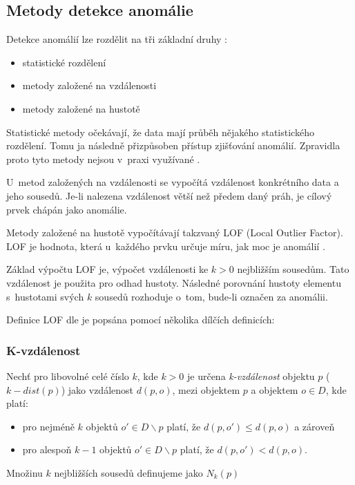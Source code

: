 \documentclass[thesis=M,czech]{FITthesis}[2012/10/20]
\begin{document}
		\subsection{Metody detekce anomálie}
			Detekce anomálií lze rozdělit na tři základní druhy \cite{KumarPCAANom}: 
			\begin{itemize} 
				\item statistické rozdělení
				\item metody založené na vzdálenosti 
				\item metody založené na hustotě		
			\end{itemize}
		
			Statistické metody očekávají, že data mají průběh nějakého statistického rozdělení. Tomu ja následně přizpůsoben přístup zjišťování anomálií. Zpravidla proto tyto metody nejsou v~praxi využívané \cite{KumarPCAANom}.
			
			U~metod založených na vzdálenosti se vypočítá vzdálenost konkrétního data a jeho sousedů. Je-li nalezena vzdálenost větší než předem daný práh, je cílový prvek chápán jako anomálie.
			
			Metody založené na hustotě vypočítávají takzvaný LOF (Local Outlier Factor). LOF je hodnota, která u~každého prvku určuje míru, jak moc je anomálií \cite{LOF}.
			
			Základ výpočtu LOF je, výpočet vzdálenosti ke $k > 0$ nejbližším sousedům. Tato vzdálenost je použita pro odhad hustoty. Následné porovnání hustoty elementu s~hustotami svých $k$ sousedů rozhoduje o~tom, bude-li označen za anomálii.
			
			Definice LOF dle \cite{LOF} je popsána pomocí několika dílčích definicích: 
			
			\subsubsection{K-vzdálenost}
				Nechť pro libovolné celé číslo $k$, kde $k > 0$ je určena \textit{k-vzdálenost} objektu $p$ ($k-dist(p)$) jako vzdálenost $d(p, o)$, mezi objektem $p$ a objektem $o \in D$, kde platí:
			
				\begin{itemize} 
					\item pro nejméně $k$ objektů $o' \in D \backslash {p}$	platí, že $d(p, o') \leq d(p, o)$ a zároveň
					\item pro alespoň $k-1$ objektů $o' \in D \backslash {p}$ platí, že $d(p, o') < d(p, o)$.
				\end{itemize}
				Množinu $k$ nejbližších sousedů definujeme jako $N_k(p)$
		
\end{document}
